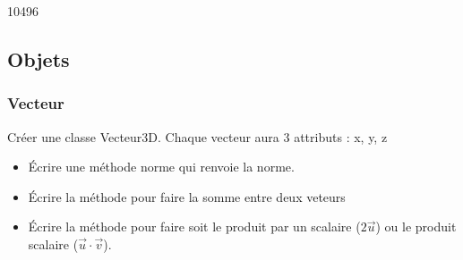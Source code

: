 \documentclass[letterpaper,10pt,english]{sphinxhowto}
\begin{document}
\begin{sphinxVerbatim}[commandchars=\\\{\}]
10496
\end{sphinxVerbatim}

\begin{sphinxVerbatim}[commandchars=\\\{\}]
  
  \PYG{p}{[}    \PYG{p}{]}
\end{sphinxVerbatim}

\begin{sphinxVerbatim}[commandchars=\\\{\}]
  
\PYG{p}{[}        \PYG{p}{]}
\end{sphinxVerbatim}

\begin{sphinxVerbatim}
\end{sphinxVerbatim}


\subsection{Objets}
\label{\detokenize{cours6_objet_corr_exercices:objets}}\label{\detokenize{cours6_objet_corr_exercices::doc}}

\subsubsection{Vecteur}
\label{\detokenize{cours6_objet_corr_exercices:vecteur}}
\sphinxAtStartPar
Créer une classe Vecteur3D. Chaque vecteur aura 3 attributs : x, y, z
\begin{itemize}
\item {} 
\sphinxAtStartPar
Écrire une méthode norme qui renvoie la norme.

\item {} 
\sphinxAtStartPar
Écrire la méthode  pour faire la somme entre deux veteurs

\item {} 
\sphinxAtStartPar
Écrire la méthode  pour faire soit le produit par un scalaire (\(2\vec{u}\)) ou le produit scalaire (\(\vec{u}\cdot\vec{v}\)).

\end{itemize}
\end{document}
